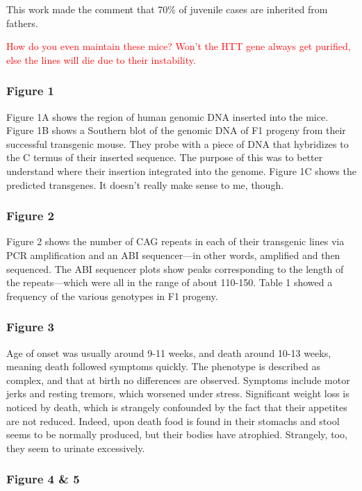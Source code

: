 \documentclass[12pt]{report}
\begin{document}
This work made the comment that 70\% of juvenile cases are inherited from fathers.\newline

\textcolor{red}{How do you even maintain these mice? Won't the HTT gene always get purified, else the lines will die due to their instability.}

\subsubsection{Figure 1}

Figure 1A shows the region of human genomic DNA inserted into the mice. Figure 1B shows a Southern blot of the genomic DNA of F1 progeny from their successful transgenic mouse. They probe with a piece of DNA that hybridizes to the C termus of their inserted sequence. The purpose of this was to better understand where their insertion integrated into the genome. Figure 1C shows the predicted transgenes. It doesn't really make sense to me, though. 

\subsubsection{Figure 2}

Figure 2 shows the number of CAG repeats in each of their transgenic lines via PCR amplification and an ABI sequencer---in other words, amplified and then sequenced. The ABI sequencer plots show peaks corresponding to the length of the repeats---which were all in the range of about 110-150. Table 1 showed a frequency of the various genotypes in F1 progeny. 

 \subsubsection{Figure 3}

 Age of onset was usually around 9-11 weeks, and death around 10-13 weeks, meaning death followed symptoms quickly. The phenotype is described as complex, and that at birth no differences are observed. Symptoms include motor jerks and resting tremors, which worsened under stress. Significant weight loss is noticed by death, which is strangely confounded by the fact that their appetites are not reduced. Indeed, upon death food is found in their stomachs and stool seems to be normally produced, but their bodies have atrophied. Strangely, too, they seem to urinate excessively.

 \subsubsection{Figure 4 \& 5}
\end{document}

